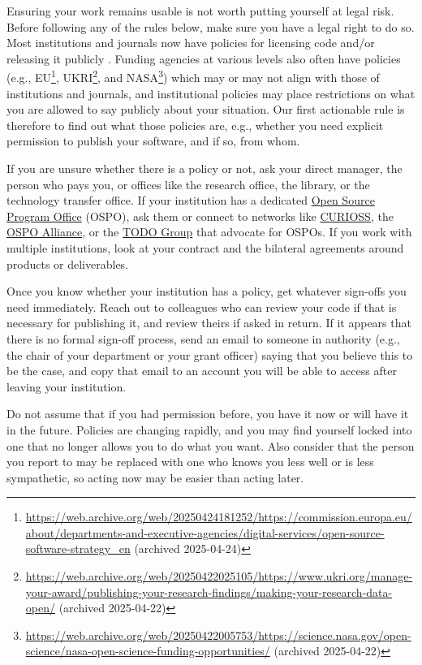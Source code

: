 \documentclass[10pt,letterpaper]{article}
\begin{document}
Ensuring your work remains usable is not worth putting yourself at legal risk.
Before following any of the rules below,
make sure you have a legal right to do so.
Most institutions and journals now have policies for licensing code and/or releasing it publicly \cite{Katz2018,Ham2019}.
Funding agencies at various levels also often have policies
(e.g.,
EU\footnote{\url{https://web.archive.org/web/20250424181252/https://commission.europa.eu/about/departments-and-executive-agencies/digital-services/open-source-software-strategy_en} (archived 2025-04-24)},
UKRI\footnote{\url{https://web.archive.org/web/20250422025105/https://www.ukri.org/manage-your-award/publishing-your-research-findings/making-your-research-data-open/} (archived 2025-04-22)},
and NASA\footnote{\url{https://web.archive.org/web/20250422005753/https://science.nasa.gov/open-science/nasa-open-science-funding-opportunities/} (archived 2025-04-22)})
which may or may not align with those of institutions and journals,
and institutional policies may place restrictions on what you are allowed to say publicly about your situation.
Our first actionable rule is therefore to find out what those policies are,
e.g.,
whether you need explicit permission to publish your software,
and if so,
from whom.

If you are unsure whether there is a policy or not,
ask your direct manager,
the person who pays you,
or offices like the research office,
the library,
or the technology transfer office.
If your institution has a dedicated
\href{https://sustainoss.org/academic-map/universities/index.html}{Open Source Program Office} (OSPO),
ask them
or connect to networks like \href{https://curioss.org}{CURIOSS},
the \href{https://ospo-alliance.org/}{OSPO Alliance},
or the \href{https://todogroup.org/}{TODO Group}
that advocate for OSPOs.
If you work with multiple institutions,
look at your contract and the bilateral agreements around products or deliverables.

Once you know whether your institution has a policy,
get whatever sign-offs you need immediately.
Reach out to colleagues who can review your code if that is necessary for publishing it,
and review theirs if asked in return.
If it appears that there is no formal sign-off process,
send an email to someone in authority
(e.g., the chair of your department or your grant officer)
saying that you believe this to be the case,
and copy that email to an account you will be able to access
after leaving your institution.

Do not assume that if you had permission before,
you have it now or will have it in the future.
Policies are changing rapidly,
and you may find yourself locked into one that no longer allows you to do what you want.
Also consider that the person you report to may be replaced with one who knows you less well or is less sympathetic,
so acting now may be easier than acting later.
\end{document}
